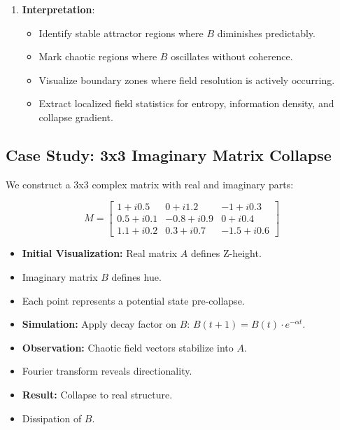 \begin{enumerate}
    \item \textbf{Interpretation}:
    \begin{itemize}
        \item Identify stable attractor regions where $B$ diminishes predictably. 
        \item Mark chaotic regions where $B$ oscillates without coherence. 
        \item Visualize boundary zones where field resolution is actively occurring. 
        \item Extract localized field statistics for entropy, information density, and collapse gradient. \cite{imaginary_meta} 
      \end{itemize}
\end{enumerate}

\subsection*{Case Study: 3x3 Imaginary Matrix Collapse}

We construct a 3x3 complex matrix with real and imaginary parts:

\[
M =
\begin{bmatrix}
1 + i0.5 & 0 + i1.2 & -1 + i0.3 \\
0.5 + i0.1 & -0.8 + i0.9 & 0 + i0.4 \\
1.1 + i0.2 & 0.3 + i0.7 & -1.5 + i0.6
\end{bmatrix}
\]

\begin{itemize}
  \item \textbf{Initial Visualization:} Real matrix $A$ defines Z-height. \cite{imaginary_meta}
  \item Imaginary matrix $B$ defines hue.
  \item Each point represents a potential state pre-collapse. \cite{imaginary_meta}
  
  \item \textbf{Simulation:} Apply decay factor on $B$: $B(t+1) = B(t) \cdot e^{-\alpha t}$.
  
  \item \textbf{Observation:} Chaotic field vectors stabilize into $A$.
  \item Fourier transform reveals directionality.
  
  \item \textbf{Result:} Collapse to real structure. \cite{imaginary_meta}
  \item Dissipation of $B$.
\end{itemize}

